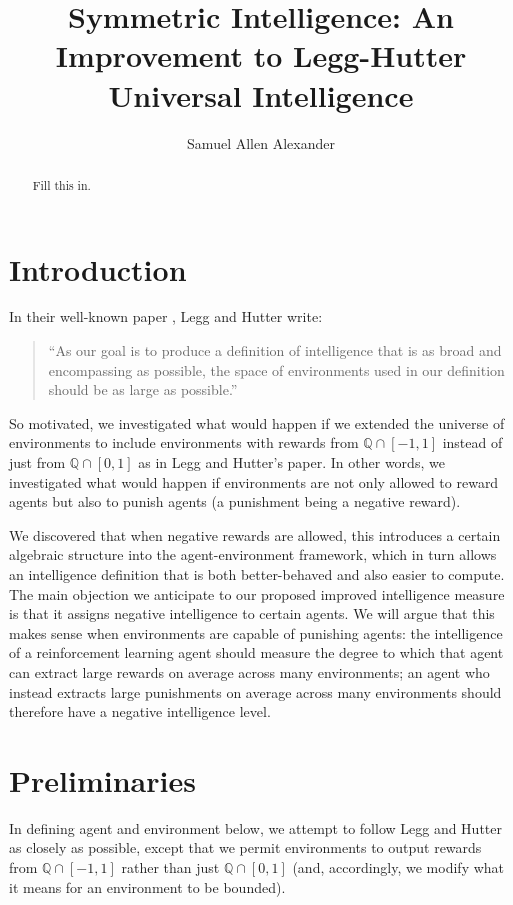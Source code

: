 \documentclass{article}
\title{Symmetric Intelligence: An Improvement to Legg-Hutter Universal Intelligence}
\author{Samuel Allen Alexander}
\begin{document}
\maketitle

\begin{abstract}
    Fill this in.
\end{abstract}

\section{Introduction}

In their well-known paper \cite{legg2007universal}, Legg and Hutter write:
\begin{quote}
    ``As our goal is to produce a definition of intelligence that is as broad and
    encompassing as possible, the space of environments used in our definition should
    be as large as possible.''
\end{quote}
So motivated, we investigated what would happen if we extended the universe
of environments to include environments with rewards from $\mathbb Q\cap [-1,1]$
instead of just from $\mathbb Q\cap [0,1]$ as in Legg and Hutter's paper.
In other words, we investigated what would happen if environments are not only
allowed to reward agents but also to punish agents (a punishment being a negative
reward).

We discovered that when negative rewards are allowed, this
introduces a certain algebraic structure into the agent-environment framework, which
in turn allows an intelligence definition that is both better-behaved and also
easier to compute. The main objection we anticipate to our proposed improved
intelligence measure is that it assigns negative intelligence to certain agents.
We will argue that this makes sense when environments are capable of punishing
agents: the intelligence of a reinforcement learning agent should measure the
degree to which that agent can extract large rewards on average across many environments;
an agent who instead extracts large punishments on average across many environments
should therefore have a negative intelligence level.

\section{Preliminaries}

In defining agent and environment below, we attempt to follow
Legg and Hutter \cite{legg2007universal} as closely as possible,
except that we permit environments to output rewards from $\mathbb Q \cap [-1,1]$
rather than just $\mathbb Q\cap [0,1]$ (and, accordingly, we modify what it means
for an environment to be bounded).
\end{document}
